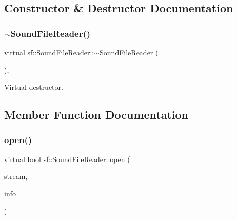 \subsection{Constructor \& Destructor Documentation}
\mbox{\label{classsf_1_1_sound_file_reader_a34163297f302d15818c76b54f815acc8}} 
\subsubsection{\texorpdfstring{$\sim$SoundFileReader()}{~SoundFileReader()}}
{\footnotesize\ttfamily virtual sf\+::\+Sound\+File\+Reader\+::$\sim$\+Sound\+File\+Reader (\begin{DoxyParamCaption}{ }\end{DoxyParamCaption})\hspace{0.3cm}{\ttfamily [inline]}, {\ttfamily [virtual]}}



Virtual destructor. 

\begin{DoxyVerb}\end{DoxyVerb}
 

\subsection{Member Function Documentation}
\mbox{\label{classsf_1_1_sound_file_reader_aa1d2fee2ba8f359c833ab74590d55935}} 
\subsubsection{\texorpdfstring{open()}{open()}}
{\footnotesize\ttfamily virtual bool sf\+::\+Sound\+File\+Reader\+::open (\begin{DoxyParamCaption}\item[{\mbox{\hyperlink{classsf_1_1_input_stream}{Input\+Stream}} \&}]{stream,  }\item[{\mbox{\hyperlink{structsf_1_1_sound_file_reader_1_1_info}{Info}} \&}]{info }\end{DoxyParamCaption})\hspace{0.3cm}{\ttfamily [pure virtual]}}



